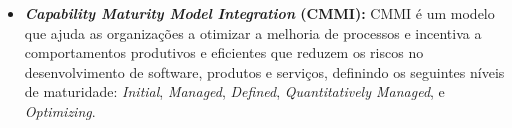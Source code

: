 \begin{itemize}
      \item \textbf{\textit{Capability Maturity Model Integration} (CMMI):} CMMI é um modelo que ajuda as organizações a otimizar a melhoria de processos e incentiva a comportamentos produtivos e eficientes que reduzem os riscos no desenvolvimento de software, produtos e serviços, definindo os seguintes níveis de maturidade: \textit{Initial}, \textit{Managed}, \textit{Defined}, \textit{Quantitatively Managed}, e \textit{Optimizing}\cite{cmmi}.

    \end{itemize}
